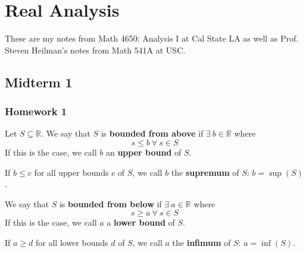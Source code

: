 %
%
%
%
%
%
%
%
%
%
%
%
%

\section{Real Analysis}

These are my notes from Math 4650: Analysis I at Cal State LA as well as Prof. Steven Heilman's notes from Math 541A at USC.


\subsection{Midterm 1}

\subsubsection{Homework 1}

\begin{definition} Let \(S \subseteq \mathbb{R}\). We say that \(S\) is \textbf{bounded from above} if \(\exists \ b \in \mathbb{R}\) where \[s \leq b \ \forall \ s \in S\]If this is the case, we call \(b\) an \textbf{upper bound} of \(S\).

If \(b \leq c \) for all upper bounds \(c\) of \(S\), we call \(b\) the \textbf{supremum} of \(S\): \(b = \sup(S)\).

\end{definition}

\begin{definition} We say that \(S\) is \textbf{bounded from below} if \(\exists \ a \in \mathbb{R}\) where \[s \geq a \ \forall \ s \in S\]If this is the case, we call \(a\) a \textbf{lower bound} of \(S\).

If \(a \geq d \) for all lower bounds \(d\) of \(S\), we call \(a\) the \textbf{infimum} of \(S\): \(a = \inf(S)\).
\end{definition}

